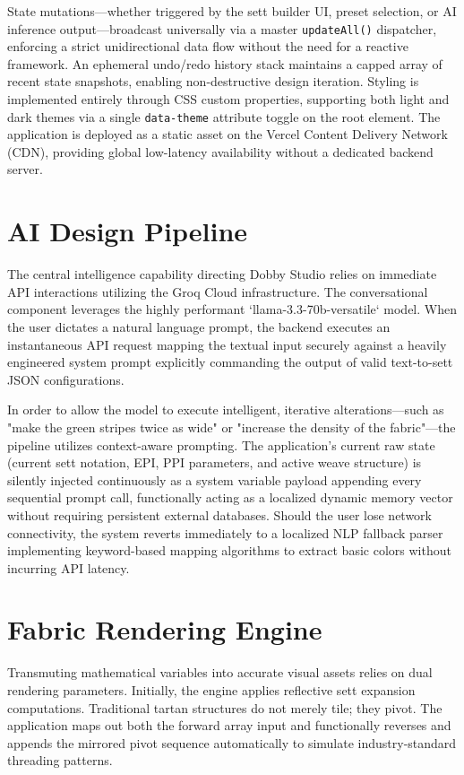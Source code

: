 State mutations---whether triggered by the sett builder UI, preset selection, or AI inference output---broadcast universally via a master \texttt{updateAll()} dispatcher, enforcing a strict unidirectional data flow without the need for a reactive framework. An ephemeral undo/redo history stack maintains a capped array of recent state snapshots, enabling non-destructive design iteration. Styling is implemented entirely through CSS custom properties, supporting both light and dark themes via a single \texttt{data-theme} attribute toggle on the root element. The application is deployed as a static asset on the Vercel Content Delivery Network (CDN), providing global low-latency availability without a dedicated backend server.

\section{AI Design Pipeline}
The central intelligence capability directing Dobby Studio relies on immediate API interactions utilizing the Groq Cloud infrastructure. The conversational component leverages the highly performant `llama-3.3-70b-versatile` model. When the user dictates a natural language prompt, the backend executes an instantaneous API request mapping the textual input securely against a heavily engineered system prompt explicitly commanding the output of valid text-to-sett JSON configurations.

In order to allow the model to execute intelligent, iterative alterations—such as "make the green stripes twice as wide" or "increase the density of the fabric"—the pipeline utilizes context-aware prompting. The application's current raw state (current sett notation, EPI, PPI parameters, and active weave structure) is silently injected continuously as a system variable payload appending every sequential prompt call, functionally acting as a localized dynamic memory vector without requiring persistent external databases. Should the user lose network connectivity, the system reverts immediately to a localized NLP fallback parser implementing keyword-based mapping algorithms to extract basic colors without incurring API latency.

\section{Fabric Rendering Engine}
Transmuting mathematical variables into accurate visual assets relies on dual rendering parameters. Initially, the engine applies reflective sett expansion computations. Traditional tartan structures do not merely tile; they pivot. The application maps out both the forward array input and functionally reverses and appends the mirrored pivot sequence automatically to simulate industry-standard threading patterns. 

